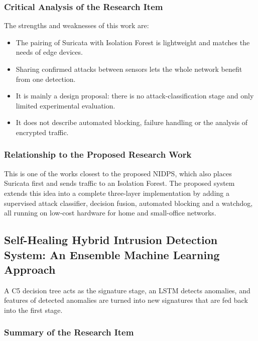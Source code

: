 \subsubsection{Critical Analysis of the Research Item}\label{sec:3.2.3.2}

\noindent The strengths and weaknesses of this work are:

\begin{itemize}
\item The pairing of Suricata with Isolation Forest is lightweight and matches the needs of edge devices.
\item Sharing confirmed attacks between sensors lets the whole network benefit from one detection.
\item It is mainly a design proposal: there is no attack-classification stage and only limited experimental evaluation.
\item It does not describe automated blocking, failure handling or the analysis of encrypted traffic.
\end{itemize}

\subsubsection{Relationship to the Proposed Research Work}\label{sec:3.2.3.3}

\noindent This is one of the works closest to the proposed NIDPS, which also places Suricata first and sends traffic to an Isolation Forest. The proposed system extends this idea into a complete three-layer implementation by adding a supervised attack classifier, decision fusion, automated blocking and a watchdog, all running on low-cost hardware for home and small-office networks.

\subsection{Self-Healing Hybrid Intrusion Detection System: An Ensemble Machine Learning Approach}\label{sec:3.2.4}

\noindent A C5 decision tree acts as the signature stage, an LSTM detects anomalies, and features of detected anomalies are turned into new signatures that are fed back into the first stage.

\subsubsection{Summary of the Research Item}\label{sec:3.2.4.1}

